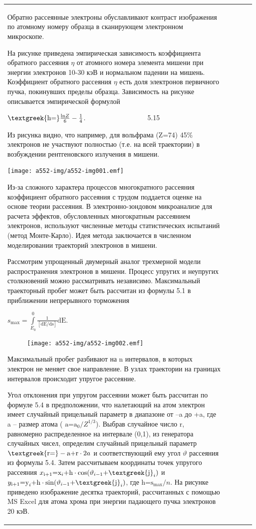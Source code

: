 \documentclass[a4paper,14pt, openany, twoside, draft]{extbook} %
\begin{document}
\begin{flushleft}
\begin{supertabular}{|m{1.7279999cm}|m{1.522cm}|m{1.522cm}|m{1.522cm}|m{1.744cm}|}
Обратно рассеянные электроны обуславливают контраст изображения по атомному номеру образца в сканирующем электронном микроскопе.

На рисунке приведена эмпирическая зависимость коэффициента обратного рассеяния ${\eta}$ от атомного номера элемента мишени при энергии электронов 10-30 кэВ и нормальном падении на мишень. Коэффициент обратного рассеяния ${\eta}$ есть доля электронов первичного пучка, покинувших пределы образца. Зависимость на рисунке описывается эмпирической формулой

 ${\text{\textgreek{h=}}}\frac{\text{ln}Z} 6-\frac 1 4$.\ \ \ \ \ \ \ \ \ \ \ \ \ \ \ \ \ \ 5.15

Из рисунка видно, что например, для вольфрама (Z=74) 45\% электронов не участвуют полностью (т.е. на всей траектории) в возбуждении рентгеновского излучения в мишени.

 \texttt{[image: a552-img/a552-img001.emf]}

Из-за сложного характера процессов многократного рассеяния коэффициент обратного рассеяния с трудом поддается оценке на основе теории рассеяния. В электронно-зондовом микроанализе для расчета эффектов, обусловленных многократным рассеянием электронов, используют численные методы статистических испытаний (метод Монте-Карло). Идея метода заключается в численном моделировании траекторий электронов в мишени.

Рассмотрим упрощенный двумерный аналог трехмерной модели распространения электронов в мишени. Процесс упругих и неупругих столкновений можно рассматривать независимо. Максимальный траекторный пробег может быть рассчитан из формулы 5.1 в приближении непрерывного торможения

 $s_{\text{max}}=\overset 0{\underset{E_0}{\int }}\frac 1{\left[{\text{dE}}/{\text{ds}}\right]}{\text{dE}}$.

\begin{figure}
\centering
\texttt{[image: a552-img/a552-img002.emf]}
\end{figure}
Максимальный пробег разбивают на n интервалов, в которых электрон не меняет свое направление. В узлах траектории на границах интервалов происходит упругое рассеяние.

Угол отклонения при упругом рассеянии может быть рассчитан по формуле 5.4 в предположении, что налетающий на атом электрон имеет случайный прицельный параметр в диапазоне от –a до +a, где a – размер атома ( ${\text{a=a}}_0/Z^{1/3}$). Выбрав случайное число r, равномерно распределенное на интервале (0,1), из генератора случайных чисел, определим случайный прицельный параметр  ${\text{\textgreek{r=}}}-{\text{a+r}}\cdot 2a$ и соответствующий ему угол  $\vartheta $ рассеяния из формулы 5.4. Затем рассчитываем координаты точек упругого рассеяния  $x_{{\text{i+}}1}{\text{=x}}_i{\text{+h}}\cdot \text{cos}(\vartheta _{i-1}{\text{+\textgreek{j}}}_i)$ и  $y_{{\text{i+}}1}{\text{=y}}_i{\text{+h}}\cdot \text{sin}(\vartheta _{i-1}{\text{+\textgreek{j}}}_i)$, где  ${\text{h=s}}_{\text{max}}/n$. На рисунке приведено изображение десятка траекторий, рассчитанных с помощью MS Excel для атома хрома при энергии падающего пучка электронов 20 кэВ.


\end{supertabular}
\end{flushleft}
\end{document}
